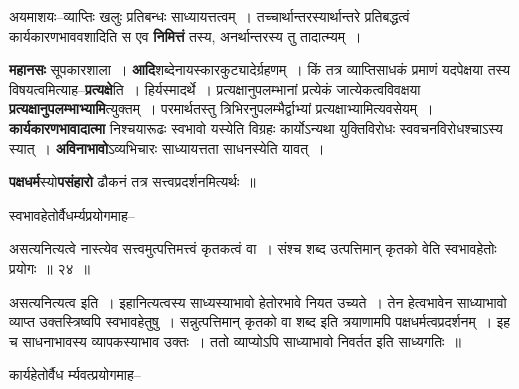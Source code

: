 \documentclass[article,12pt,a4paper]{memoir}
\begin{document}
	  \pstart अयमाशयः--व्याप्तिः खलुः प्रतिबन्धः साध्यायत्तत्वम् । तच्चार्थान्तरस्यार्थान्तरे प्रतिबद्धत्वं कार्यकारणभाववशादिति स एव \textbf{निमित्तं} तस्य, अनर्थान्तरस्य तु तादा\leavevmode{}त्म्यम् ।
	\pend
      

	  \pstart \textbf{महानसः} सूपकारशाला । \textbf{आदि}शब्देनायस्कारकुट्यादेर्ग्रहणम् । किं तत्र व्याप्तिसाधकं प्रमाणं यदपेक्षया तस्य विषयत्वमित्याह--\textbf{प्रत्यक्षे}ति । हिर्यस्मादर्थे । प्रत्यक्षानुपलम्भानां प्रत्येकं जात्येकत्वविवक्षया \textbf{प्रत्यक्षानुपलम्भाभ्यामि}त्युक्तम् । परमार्थतस्तु त्रिभिरनुपलम्भैर्द्वाभ्यां प्रत्यक्षाभ्यामित्यवसेयम् । \textbf{कार्यकारणभावादात्मा} निश्चयारूढः स्वभावो यस्येति विग्रहः कार्योऽन्यथा युक्तिविरोधः स्ववचनविरोधश्चाऽस्य स्यात् । \textbf{अविनाभावो}ऽव्यभिचारः साध्यायत्तता साधनस्येति यावत् ।
	\pend
      

	  \pstart \textbf{पक्षधर्म}स्यो\textbf{पसंहारो} ढौकनं तत्र सत्त्वप्रदर्शनमित्यर्थः ॥
	\pend
	  \bigskip
	  \begingroup
	

	  \pstart स्वभावहेतोर्वैधर्म्यप्रयोगमाह--
	\pend
        
	  \bigskip
	  \begingroup
	

	  \pstart असत्यनित्यत्वे नास्त्येव सत्त्वमुत्पत्तिमत्त्वं कृतकत्वं वा । संश्च शब्द उत्पत्तिमान् कृतको वेति स्वभावहेतोः प्रयोगः ॥ २४ ॥
	\pend
      
	  \endgroup
	 

	  \pstart असत्यनित्यत्व इति । इहानित्यत्वस्य साध्यस्याभावो हेतोरभावे नियत उच्यते । तेन हेत्वभावेन साध्याभावो व्याप्त उक्तस्त्रिष्वपि स्वभावहेतुषु । सन्नुत्पत्तिमान् कृतको वा शब्द इति त्रयाणामपि पक्षधर्मत्वप्रदर्शनम् । इह च साधनाभावस्य व्यापकस्याभाव उक्तः । ततो व्याप्योऽपि साध्याभावो निवर्तत इति साध्यगतिः ॥
	\pend
        

	  \pstart कार्यहेतोर्वैध र्म्यवत्प्रयोगमाह--
	\pend
        
\end{document}

